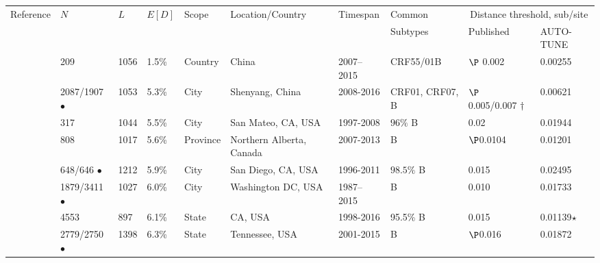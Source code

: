 \documentclass[utf8]{FrontiersinHarvard} %
\begin{document}
\begin{table}[h!]
	\vspace{10pt}
	\centering
	\begin{ssmall}
		\begin{tabular}{llllllllll}
			\hline
			Reference                   & $N$                 & $L$  & $E[D]$ & Scope      & Location/Country         & Timespan  & Common                & \multicolumn{2}{c}{Distance threshold, sub/site}                  \\
			                            &                     &      &        &            &                          &           & Subtypes              & Published                                  & AUTO-TUNE      \\
			\hline
			\cite{Zai:2020aa}           & 209                 & 1056 & 1.5\%  & Country    & China                    & 2007–2015 & CRF55/01B             & $\P$ 0.002                                   & 0.00255          \\
			\cite{liu_dynamics_2020}    & 2087/1907 $\bullet$ & 1053 & 5.3\%  & City       & Shenyang, China          & 2008-2016 & CRF01, CRF07, B       & $\P$ 0.005/0.007 $\dagger$                     & 0.00621          \\
			\cite{dalai_combining_2018} & 317                 & 1044 & 5.5\%  & City       & San Mateo, CA, USA       & 1997-2008 & $96\%$ B              & 0.02                                          & 0.01944          \\
			\cite{chato_public_2020}    & 808                 & 1017 & 5.6\%  & Province   & Northern Alberta, Canada & 2007-2013 & B                     & $\P$0.0104                                   & 0.01201          \\
			\cite{Little:2014aa}        & 648/646 $\bullet$   & 1212 & 5.9\%  & City       & San Diego, CA, USA       & 1996-2011 & $98.5\%$ B            & 0.015                                        & 0.02495          \\
			\cite{Perez-Losada:2017aa}  & 1879/3411 $\bullet$ & 1027 & 6.0\%  & City       & Washington DC, USA       & 1987–2015 & B                     & 0.010                                        & 0.01733          \\
			\cite{rhee_national_2019}   & 4553                & 897  & 6.1\%  & State      & CA, USA                  & 1998-2016 & 95.5\% B              & 0.015                                        & 0.01139$\star$   \\
			\cite{chato_public_2020}    & 2779/2750 $\bullet$ & 1398 & 6.3\%  & State      & Tennessee, USA           & 2001-2015 & B                     & $\P$0.016                                    & 0.01872          \\

\end{tabular}
\end{ssmall}
\end{table}
\end{document}
